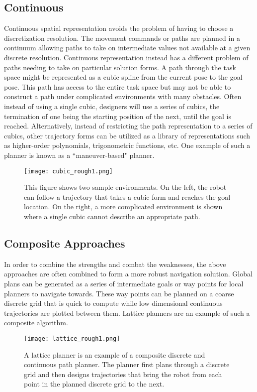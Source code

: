 \subsection{Continuous}
Continuous spatial representation avoids the problem of having to choose a discretization resolution. The movement commands or paths
are planned in a continuum allowing paths to take on intermediate values not available at a given discrete resolution.
Continuous representation instead has a different problem of paths needing to take on particular solution forms. A path
through the task space might be represented as a cubic spline from the current pose to the goal pose. This path has access
to the entire task space but may not be able to construct a path under complicated environments with many obstacles. Often
instead of using a single cubic, designers will use a series of cubics, the termination of one being the starting
position of the next, until the goal is reached. 
Alternatively, instead of restricting the path representation to a series of cubics, other trajectory forms can be
utilized as a library of representations such as higher-order polynomials, trigonometric functions, etc.
One example of such a planner is known as a ``maneuver-based" planner.
\begin{figure}
	\centering
	\texttt{[image: cubic\_rough1.png]}
	\caption
	{This figure shows two sample environments. On the left, the robot can follow a trajectory that takes
	a cubic form and reaches the goal location. On the right, a more complicated environment is shown where a single 
	cubic cannot describe an appropriate path.}
	\label{fig:cubic1}
\end{figure}

\subsection{Composite Approaches}
In order to combine the strengths and combat the weaknesses, the above approaches are often combined to form a more robust
navigation solution. Global plans can be generated as a series of intermediate goals or way points for local planners to 
navigate towards. These way points can be planned on a coarse discrete grid that is quick to compute while low dimensional
continuous trajectories are plotted between them. Lattice planners are an example of such a composite algorithm. 
\begin{figure}
	\centering
	\texttt{[image: lattice\_rough1.png]}
	\caption
	{A lattice planner is an example of a composite discrete and continuous path planner. The planner
	first plans through a discrete grid and then designs trajectories that bring the robot from each point in the planned discrete grid to the next.}
	\label{fig:lattice1}
\end{figure}

